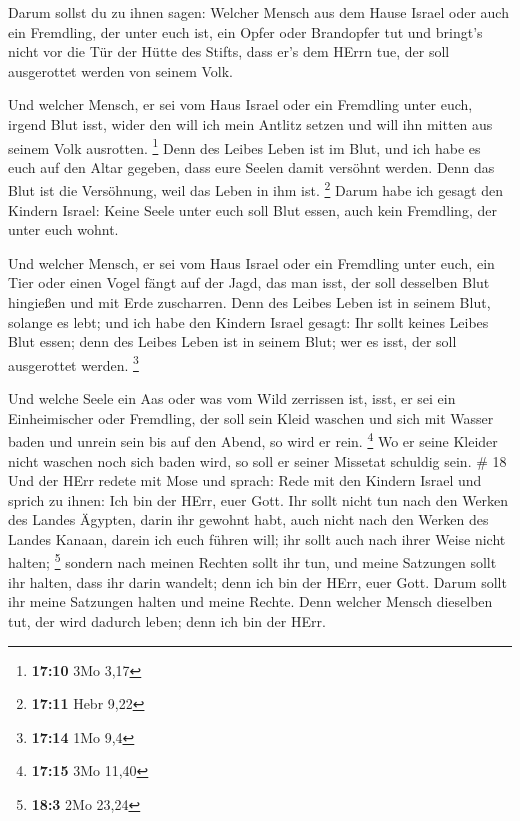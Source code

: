  Darum sollst du zu ihnen sagen: Welcher Mensch aus dem
Hause Israel oder auch ein Fremdling, der unter euch ist, ein Opfer oder
Brandopfer tut  und bringt's nicht vor die Tür der Hütte des
Stifts, dass er's dem HErrn tue, der soll ausgerottet werden von seinem
Volk.

 Und welcher Mensch, er sei vom Haus Israel oder ein
Fremdling unter euch, irgend Blut isst, wider den will ich mein Antlitz
setzen und will ihn mitten aus seinem Volk ausrotten. \footnote{\textbf{17:10}
  3Mo 3,17}  Denn des Leibes Leben ist im Blut, und ich
habe es euch auf den Altar gegeben, dass eure Seelen damit versöhnt
werden. Denn das Blut ist die Versöhnung, weil das Leben in ihm ist.
\footnote{\textbf{17:11} Hebr 9,22}  Darum habe ich gesagt
den Kindern Israel: Keine Seele unter euch soll Blut essen, auch kein
Fremdling, der unter euch wohnt.

 Und welcher Mensch, er sei vom Haus Israel oder ein
Fremdling unter euch, ein Tier oder einen Vogel fängt auf der Jagd, das
man isst, der soll desselben Blut hingießen und mit Erde zuscharren.
 Denn des Leibes Leben ist in seinem Blut, solange es lebt;
und ich habe den Kindern Israel gesagt: Ihr sollt keines Leibes Blut
essen; denn des Leibes Leben ist in seinem Blut; wer es isst, der soll
ausgerottet werden. \footnote{\textbf{17:14} 1Mo 9,4}

 Und welche Seele ein Aas oder was vom Wild zerrissen ist,
isst, er sei ein Einheimischer oder Fremdling, der soll sein Kleid
waschen und sich mit Wasser baden und unrein sein bis auf den Abend, so
wird er rein. \footnote{\textbf{17:15} 3Mo 11,40}  Wo er
seine Kleider nicht waschen noch sich baden wird, so soll er seiner
Missetat schuldig sein. \# 18  Und der HErr redete mit Mose
und sprach:  Rede mit den Kindern Israel und sprich zu
ihnen: Ich bin der HErr, euer Gott.  Ihr sollt nicht tun
nach den Werken des Landes Ägypten, darin ihr gewohnt habt, auch nicht
nach den Werken des Landes Kanaan, darein ich euch führen will; ihr
sollt auch nach ihrer Weise nicht halten; \footnote{\textbf{18:3} 2Mo
  23,24}  sondern nach meinen Rechten sollt ihr tun, und
meine Satzungen sollt ihr halten, dass ihr darin wandelt; denn ich bin
der HErr, euer Gott.  Darum sollt ihr meine Satzungen halten
und meine Rechte. Denn welcher Mensch dieselben tut, der wird dadurch
leben; denn ich bin der HErr.

